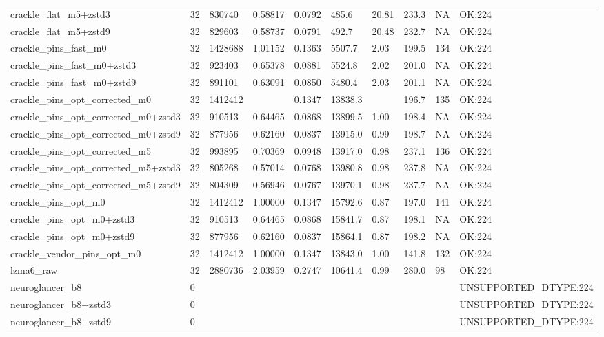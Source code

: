 \begin{table}[t]
\begin{tabular}{llllllllll}
crackle\_flat\_m5+zstd3 & 32 & 830740 & 0.58817 & 0.0792 & 485.6 & 20.81 & 233.3 & NA & OK:224 \\
crackle\_flat\_m5+zstd9 & 32 & 829603 & 0.58737 & 0.0791 & 492.7 & 20.48 & 232.7 & NA & OK:224 \\
crackle\_pins\_fast\_m0 & 32 & 1428688 & 1.01152 & 0.1363 & 5507.7 & 2.03 & 199.5 & 134 & OK:224 \\
crackle\_pins\_fast\_m0+zstd3 & 32 & 923403 & 0.65378 & 0.0881 & 5524.8 & 2.02 & 201.0 & NA & OK:224 \\
crackle\_pins\_fast\_m0+zstd9 & 32 & 891101 & 0.63091 & 0.0850 & 5480.4 & 2.03 & 201.1 & NA & OK:224 \\
crackle\_pins\_opt\_corrected\_m0 & 32 & 1412412 &  & 0.1347 & 13838.3 &  & 196.7 & 135 & OK:224 \\
crackle\_pins\_opt\_corrected\_m0+zstd3 & 32 & 910513 & 0.64465 & 0.0868 & 13899.5 & 1.00 & 198.4 & NA & OK:224 \\
crackle\_pins\_opt\_corrected\_m0+zstd9 & 32 & 877956 & 0.62160 & 0.0837 & 13915.0 & 0.99 & 198.7 & NA & OK:224 \\
crackle\_pins\_opt\_corrected\_m5 & 32 & 993895 & 0.70369 & 0.0948 & 13917.0 & 0.98 & 237.1 & 136 & OK:224 \\
crackle\_pins\_opt\_corrected\_m5+zstd3 & 32 & 805268 & 0.57014 & 0.0768 & 13980.8 & 0.98 & 237.8 & NA & OK:224 \\
crackle\_pins\_opt\_corrected\_m5+zstd9 & 32 & 804309 & 0.56946 & 0.0767 & 13970.1 & 0.98 & 237.7 & NA & OK:224 \\
crackle\_pins\_opt\_m0 & 32 & 1412412 & 1.00000 & 0.1347 & 15792.6 & 0.87 & 197.0 & 141 & OK:224 \\
crackle\_pins\_opt\_m0+zstd3 & 32 & 910513 & 0.64465 & 0.0868 & 15841.7 & 0.87 & 198.1 & NA & OK:224 \\
crackle\_pins\_opt\_m0+zstd9 & 32 & 877956 & 0.62160 & 0.0837 & 15864.1 & 0.87 & 198.2 & NA & OK:224 \\
crackle\_vendor\_pins\_opt\_m0 & 32 & 1412412 & 1.00000 & 0.1347 & 13843.0 & 1.00 & 141.8 & 132 & OK:224 \\
lzma6\_raw & 32 & 2880736 & 2.03959 & 0.2747 & 10641.4 & 0.99 & 280.0 & 98 & OK:224 \\
neuroglancer\_b8 & 0 &  &  &  &  &  &  &  & UNSUPPORTED\_DTYPE:224 \\
neuroglancer\_b8+zstd3 & 0 &  &  &  &  &  &  &  & UNSUPPORTED\_DTYPE:224 \\
neuroglancer\_b8+zstd9 & 0 &  &  &  &  &  &  &  & UNSUPPORTED\_DTYPE:224 \\

\end{tabular}
\end{table}
